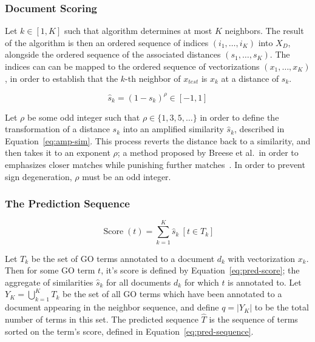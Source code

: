 \documentclass[11pt]{article}
\theoremstyle{plain}
\theoremstyle{definition}
\begin{document}
\subsubsection{Document Scoring}\label{sec:methods-scoring-document}

Let $k \in [1, K]$ such that algorithm determines at most $K$ neighbors. The result of the algorithm is then an ordered sequence of indices $(i_1, \dots, i_K)$ into $X_D$, alongside the ordered sequence of the associated distances $(s_1, \dots, s_K)$. The indices can can be mapped to the ordered sequence of vectorizations $(x_1, \dots, x_K)$, in order to establish that the $k$-th neighbor of $x_{test}$ is $x_k$ at a distance of $s_k$.

\begin{equation}\label{eq:amp-sim}
    \hat{s}_k = {(1-s_k)}^\rho \in [-1, 1]
\end{equation}

Let $\rho$ be some odd integer such that $\rho \in \{1,3,5,\dots\}$ in order to define the transformation of a distance $s_k$ into an amplified similarity $\hat{s}_k$, described in Equation~\ref{eq:amp-sim}. This process reverts the distance back to a similarity, and then takes it to an exponent $\rho$; a method proposed by Breese et al.\ in order to emphasizes closer matches while punishing further matches~\cite{bresse/1998/emprirical}. In order to prevent sign degeneration, $\rho$ must be an odd integer.

\subsubsection{The Prediction Sequence}\label{sec:methods-scoring-sequence}

\begin{equation}
    \operatorname{Score}(t) = \sum_{k=1}^{K} \hat{s}_k\ [t \in T_k]
    \label{eq:pred-score}
\end{equation}

Let $T_k$ be the set of GO terms annotated to a document $d_k$ with vectorization $x_k$. Then for some GO term $t$, it's score is defined by Equation~\ref{eq:pred-score}; the aggregate of similarities $\hat{s}_k$ for all documents $d_k$ for which $t$ is annotated to. Let $Y_K= \bigcup_{k=1}^K T_k$ be the set of all GO terms which have been annotated to a document appearing in the neighbor sequence, and define $q=|Y_K|$ to be the total number of terms in this set. The predicted sequence $\hat{T}$ is the sequence of terms sorted on the term's score, defined in Equation~\ref{eq:pred-sequence}.
\end{document}
